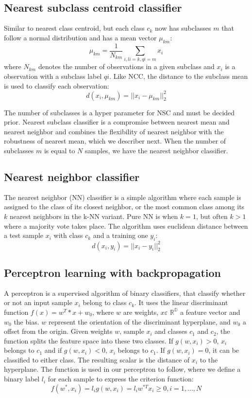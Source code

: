 \documentclass[journal]{IEEEtran}
\begin{document}
\subsection{Nearest subclass centroid classifier}

Similar to nearest class centroid, but each class $c_{k}$ now has subclasses $m$ that follow a normal distribution and has a mean vector $\mu_{km}$: $$ \mu_{km} = \frac{1}{N_{km}} \sum_{i,li=k, qi=m}^{} x_{i} $$ where $N_{km}$ denotes the number of observations in a given subclass and $x_{i}$ is a observation with a subclass label $qi$. Like NCC, the distance to the subclass mean is used to classify each observation: $$ d(x_{i},\mu_{km}) = ||x_{i}-\mu_{km}||^2_{2} $$

The number of subclasses is a hyper parameter for NSC and must be decided prior. Nearest subclass classifier is a compromise between nearest mean and nearest neighbor and combines the flexibility of nearest neighbor with the robustness of nearest mean, which we describer next. When the number of subclasses $m$ is equal to $N$ samples, we have the nearest neighbor classifier.

\subsection{Nearest neighbor classifier}

The nearest neighbor (NN) classifier is a simple algorithm where each sample is assigned to the class of its closest neighbor, or the most common class among its $k$ nearest neighbors in the k-NN variant. Pure NN is when $k=1$, but often $k>1$ where a majority vote takes place. The algorithm uses euclidean distance between a test sample $x_{i}$ with class $c_{k}$ and a training one $y_{i}$: $$ d(x_{i},y_{i}) = ||x_{i}-y_{i}||^2_{2} $$

\subsection{Perceptron learning with backpropagation}

A perceptron is a supervised algorithm of binary classifiers, that classify whether or not an input sample $x_{i}$ belong to class $c_{k}$. It uses the linear discriminant function $f(x) = w^T*x + w_{0}$, where $w$ are weights, $x\varepsilon$ $\mathbb{R^D}$ a feature vector and $w_{0}$ the bias. $w$ represent the orientation of the discriminant hyperplane, and $w_{0}$ a offset from the origin. Given weights $w$, sample $x_{i}$ and classes $c_{1}$ and $c_{2}$, the function splits the feature space into these two classes. If $g(w,x_{i}) > 0$, $x_{i}$ belongs to $c_{1}$ and if $g(w,x_{i}) < 0$, $x_{i}$ belongs to $c_{1}$. If $g(w,x_{i}) = 0$, it can be classified to either class. The resulting scalar is the distance of $x_{i}$ to the hyperplane. The function is used in our perceptron to follow, where we define a binary label $l_{i}$ for each sample to express the criterion function: $$ f(w^*,x_{i}) = l_{i} g(w,x_{i}) = l_{i} w^{*T} x_{i} \geq 0, i = 1, ..., N $$
\end{document}

